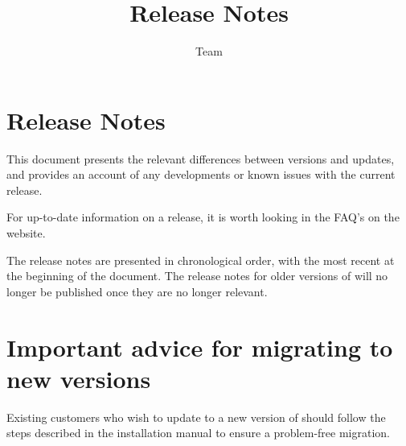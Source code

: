 
\title{\app{} Release Notes}
\author*{\app{} Team}{}
\maketitle

\setcounter{secnumdepth}{0}

\clearpage
\section{\app{} Release Notes}
This document presents the relevant differences between versions and updates, and provides an account of any developments or known issues with the current release. 

For up-to-date information on a release, it is worth looking in the FAQ's on the \app{} website. 

The release notes are presented in chronological order, with the most recent at the beginning of the document. The release notes for older versions of \app{}  will no longer be published once they are no longer relevant. 

\section{Important advice for migrating to new \app{} versions}
Existing customers who wish to update to a new version of \app{} should follow the steps described in the installation manual to ensure a problem-free migration.








